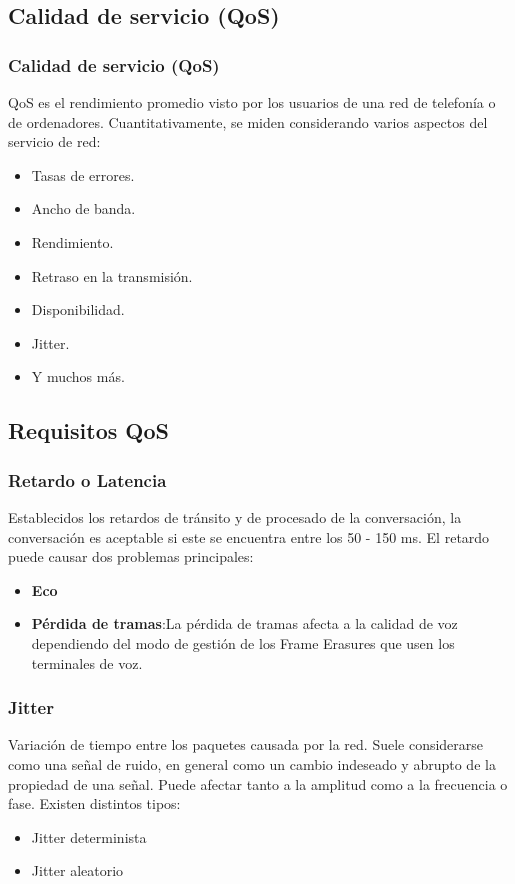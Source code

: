 \documentclass{beamer}
\begin{document}
	\subsection{Calidad de servicio (QoS)}
	\begin{frame}
	\frametitle{Calidad de servicio (QoS)}
		QoS es el rendimiento promedio visto por los usuarios de una red de telefonía o de ordenadores. Cuantitativamente, se miden considerando varios aspectos del servicio de red:
		\begin{itemize}
			\item Tasas de errores.
			\item Ancho de banda.
			\item Rendimiento.
			\item Retraso en la transmisión.
			\item Disponibilidad.
			\item Jitter.
			\item Y muchos más.
		\end{itemize}
	\end{frame}
	
	\subsection{Requisitos QoS}
	\begin{frame}
	\frametitle{Retardo o Latencia}
		Establecidos los retardos de tránsito y de procesado de la conversación, la conversación es aceptable si este se encuentra entre los 50 - 150 ms. 
		El retardo puede causar dos problemas principales:
		\begin{itemize}
			\item \textbf{Eco}
			\item \textbf{Pérdida de tramas}:La pérdida de tramas afecta a la calidad de voz dependiendo del modo de gestión de los Frame Erasures que usen los terminales de voz.
		\end{itemize}
	\end{frame}
	
	\begin{frame}
	\frametitle{Jitter}
		Variación de tiempo entre los paquetes causada por la red. Suele considerarse como una señal de ruido, en general como un cambio indeseado y abrupto de la propiedad de una señal. Puede afectar tanto a la amplitud como a la frecuencia o fase.
		Existen distintos tipos:
		\begin{itemize}
			\item Jitter determinista
			\item Jitter aleatorio
			\end{itemize}
	\end{frame}
	
\end{document}
